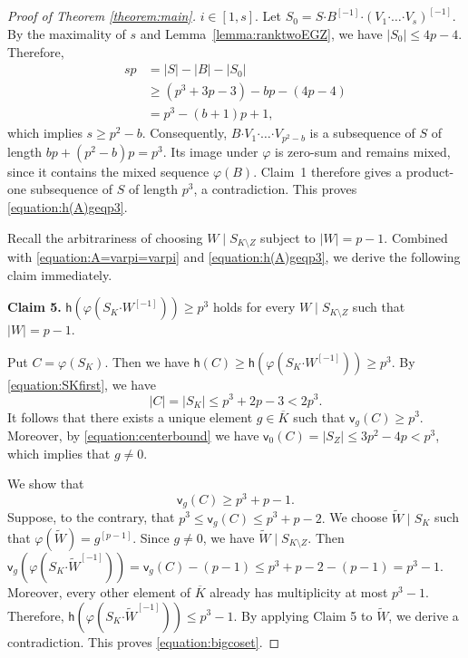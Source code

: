 \documentclass[a4paper, 12pt]{article}
\theoremstyle{definition}
\begin{document}
\begin{proof}[Proof of Theorem \ref{theorem:main}]
$i\in[1,s]$. Let
$S_0=
S\boldsymbol{\cdot}B^{[-1]}
\boldsymbol{\cdot}
\left(
V_1\boldsymbol{\cdot}\ldots\boldsymbol{\cdot}V_s
\right)^{[-1]}.$
By the maximality of $s$ and Lemma~\ref{lemma:ranktwoEGZ}, we have
$|S_0|\leq4p-4$. Therefore,
$$
\begin{aligned}
sp
&=|S|-|B|-|S_0|\\
&\geq
(p^3+3p-3)-bp-(4p-4)\\
&=p^3-(b+1)p+1,
\end{aligned}
$$
which implies
$s\geq p^2-b.$
Consequently,
$B\boldsymbol{\cdot}
V_1\boldsymbol{\cdot}\ldots
\boldsymbol{\cdot}V_{p^2-b}$
is a subsequence of $S$ of length
$bp+(p^2-b)p=p^3.$
Its image under $\varphi$ is zero-sum and remains mixed, since it
contains the mixed sequence $\varphi(B)$. Claim~1 therefore gives a
product-one subsequence of $S$ of length $p^3$, a contradiction. This proves \eqref{equation:h(A)geqp3}.



Recall the arbitrariness of choosing $W\mid S_{K\setminus Z}$ subject to
$|W|=p-1$.  Combined with \eqref{equation:A=varpi=varpi} and \eqref{equation:h(A)geqp3}, we derive the following claim immediately.

\medskip

\noindent\textbf{Claim 5.} $\mathsf h\left(\varphi\left(S_K\boldsymbol{\cdot}W^{[-1]}\right)\right)\geq p^3$ holds for every $W\mid S_{K\setminus Z}$ such that $|W|=p-1$.

\medskip








Put
$C=\varphi(S_K).$
Then we have
$\mathsf h(C)\geq \mathsf h\left(
\varphi\left(
S_K\boldsymbol{\cdot}W^{[-1]}\right)\right)\geq  p^3$.
By \eqref{equation:SKfirst}, we have
$$|C|=|S_K|
\leq p^3+2p-3
<2p^3.$$
It follows that there exists a unique element
$g\in\overline K$ such that
$\mathsf v_g(C)\geq p^3.$ Moreover, by \eqref{equation:centerbound} we have
$\mathsf v_0(C)=|S_Z|
\leq3p^2-4p
<p^3$, which implies that $g\neq 0$.


We show that
\begin{equation}\label{equation:bigcoset}
\mathsf v_g(C)\geq p^3+p-1.
\end{equation}
Suppose, to the contrary, that
$p^3\leq \mathsf v_g(C)\leq p^3+p-2.$ We choose $\widetilde{W}\mid S_K$ such that $\varphi(\widetilde{W})=g^{[p-1]}$.
Since $g\neq 0$, we have $\widetilde{W}\mid S_{K\setminus Z}$.  Then $\mathsf v_g\left(
\varphi\left(
S_K\boldsymbol{\cdot}\widetilde{W}^{[-1]}
\right)
\right)=\mathsf v_g(C)-(p-1)\leq p^3+p-2-(p-1)=
p^3-1$. Moreover, every other element of $\overline K$ already has
multiplicity at most $p^3-1$.
Therefore,
$\mathsf h\left(
\varphi\left(
S_K\boldsymbol{\cdot}\widetilde{W}^{[-1]}
\right)
\right)
\leq p^3-1.$
By applying Claim 5 to $\widetilde{W}$, we derive a contradiction. This proves \eqref{equation:bigcoset}.






\end{proof}
\end{document}
